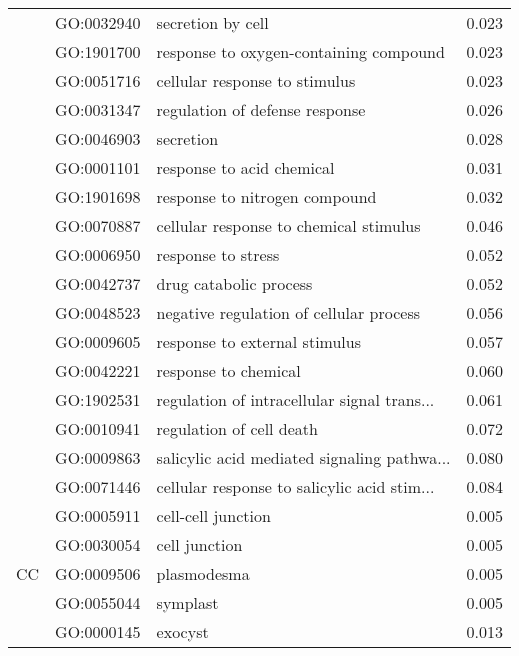 \begin{longtable}{lllr}
   & GO:0032940 &                            secretion by cell &         0.023 \\
   & GO:1901700 &       response to oxygen-containing compound &         0.023 \\
   & GO:0051716 &                cellular response to stimulus &         0.023 \\
   & GO:0031347 &               regulation of defense response &         0.026 \\
   & GO:0046903 &                                    secretion &         0.028 \\
   & GO:0001101 &                    response to acid chemical &         0.031 \\
   & GO:1901698 &                response to nitrogen compound &         0.032 \\
   & GO:0070887 &       cellular response to chemical stimulus &         0.046 \\
   & GO:0006950 &                           response to stress &         0.052 \\
   & GO:0042737 &                       drug catabolic process &         0.052 \\
   & GO:0048523 &      negative regulation of cellular process &         0.056 \\
   & GO:0009605 &                response to external stimulus &         0.057 \\
   & GO:0042221 &                         response to chemical &         0.060 \\
   & GO:1902531 &  regulation of intracellular signal trans... &         0.061 \\
   & GO:0010941 &                     regulation of cell death &         0.072 \\
   & GO:0009863 &  salicylic acid mediated signaling pathwa... &         0.080 \\
   & GO:0071446 &  cellular response to salicylic acid stim... &         0.084 \\
\cline{1-4}
\multirow{7}{*}{CC} & GO:0005911 &                           cell-cell junction &         0.005 \\
   & GO:0030054 &                                cell junction &         0.005 \\
   & GO:0009506 &                                  plasmodesma &         0.005 \\
   & GO:0055044 &                                     symplast &         0.005 \\
   & GO:0000145 &                                      exocyst &         0.013 \\

\end{longtable}
